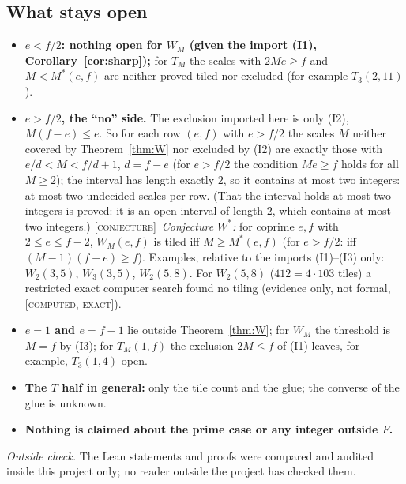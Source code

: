 \documentclass[11pt,reqno]{amsart}
\theoremstyle{plain}
\theoremstyle{definition}
\newcommand{\lab}[1]{\textup{[\textsc{#1}]}}
\newcommand{\CE}{\lab{computed, exact}}
\newcommand{\CJ}{\lab{conjecture}}
\begin{document}
\subsection{What stays open}
\begin{itemize}
\item \textbf{$e<f/2$: nothing open for $W_M$ (given the import (I1), Corollary~\ref{cor:sharp});} for $T_M$ the scales with $2Me\ge f$ and $M<M^*(e,f)$ are neither proved tiled nor excluded (for example $T_3(2,11)$).
\item \textbf{$e>f/2$, the ``no'' side.} The exclusion imported here is only (I2), $M(f-e)\le e$. So for each row $(e,f)$ with $e>f/2$ the scales $M$ neither covered by Theorem~\ref{thm:W} nor excluded by (I2) are exactly those with $e/d<M<f/d+1$, $d=f-e$ (for $e>f/2$ the condition $Me\ge f$ holds for all $M\ge2$); the interval has length exactly $2$, so it contains at most two integers: at most two undecided scales per row. (That the interval holds at most two integers is proved: it is an open interval of length $2$, which contains at most two integers.) \CJ{}\ \emph{Conjecture $W^*$:} for coprime $e,f$ with $2\le e\le f-2$, $W_M(e,f)$ is tiled iff $M\ge M^*(e,f)$ (for $e>f/2$: iff $(M-1)(f-e)\ge f$).
Examples, relative to the imports (I1)--(I3) only: $W_2(3,5)$, $W_3(3,5)$, $W_2(5,8)$. For $W_2(5,8)$ ($412=4\cdot103$ tiles) a restricted exact computer search found no tiling (evidence only, not formal, \CE{}).
\item \textbf{$e=1$ and $e=f-1$} lie outside Theorem~\ref{thm:W}; for $W_M$ the threshold is $M=f$ by (I3); for $T_M(1,f)$ the exclusion $2M\le f$ of (I1) leaves, for example, $T_3(1,4)$ open.
\item \textbf{The $T$ half in general:} only the tile count and the glue; the converse of the glue is unknown.
\item \textbf{Nothing is claimed about the prime case or any integer outside $F$.}
\end{itemize}
\emph{Outside check.} The Lean statements and proofs were compared and audited inside this project only; no reader outside the project has checked them.

\end{document}
